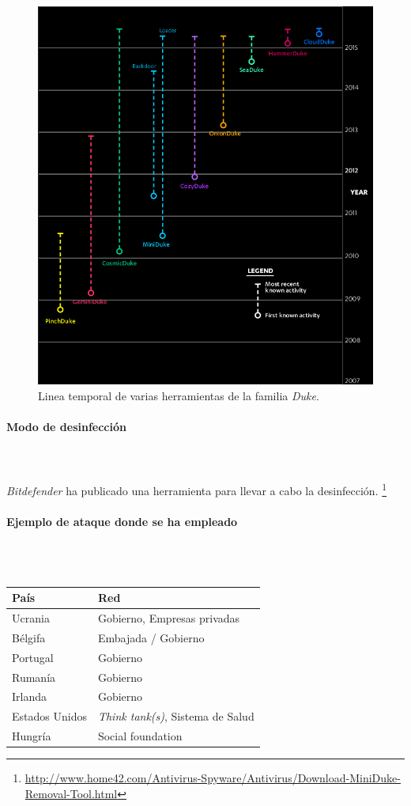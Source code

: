 \documentclass[11pt,a4paper]{article}
\begin{document}
\begin{figure}[h]
  \centering
  \includegraphics[width=\textwidth]{./referencias/timeline.png}
  \caption[Linea temporal \emph{Dukes}.]{Linea temporal de varias
    herramientas de la familia \emph{Duke}.}
  \label{fig:timeline}
\end{figure}

\paragraph{Modo de desinfección}~\\\\\qquad \emph{Bitdefender} ha publicado una herramienta para llevar a cabo la
desinfección.
\footnote{\href{http://www.home42.com/Antivirus-Spyware/Antivirus/Download-MiniDuke-Removal-Tool.html}{http://www.home42.com/Antivirus-Spyware/Antivirus/Download-MiniDuke-Removal-Tool.html}}
\paragraph{Ejemplo de ataque donde se ha empleado}~\\\\\qquad
  \begin{tabular}{l |l}
    \textbf{País}&\textbf{Red} \\ \hline
    Ucrania&Gobierno, Empresas privadas \\
    Bélgifa&Embajada / Gobierno \\
    Portugal&Gobierno \\
    Rumanía&Gobierno \\ 
    Irlanda&Gobierno \\
    Estados Unidos& \emph{Think tank(s)}, Sistema de Salud \\
    Hungría&Social foundation
  \end{tabular}
\end{document}
